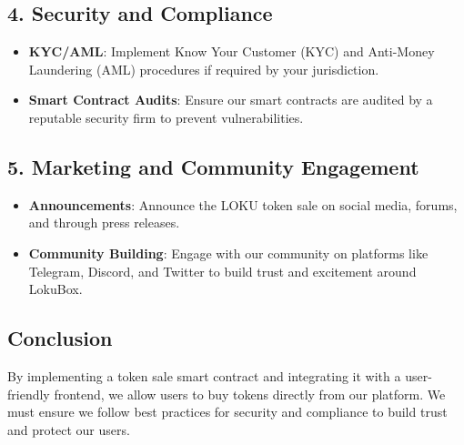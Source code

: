 \documentclass{tufte-handout}
\begin{document}
\subsection*{4. Security and Compliance}

\begin{itemize}
    \item \textbf{KYC/AML}: Implement Know Your Customer (KYC) and Anti-Money Laundering (AML) procedures if required by your jurisdiction.
    \item \textbf{Smart Contract Audits}: Ensure our smart contracts are audited by a reputable security firm to prevent vulnerabilities.
\end{itemize}

\subsection*{5. Marketing and Community Engagement}

\begin{itemize}
    \item \textbf{Announcements}: Announce the LOKU token sale on social media, forums, and through press releases.
    \item \textbf{Community Building}: Engage with our community on platforms like Telegram, Discord, and Twitter to build trust and excitement around LokuBox.
\end{itemize}

\subsection*{Conclusion}

By implementing a token sale smart contract and integrating it with a user-friendly frontend, we allow users to buy tokens directly from our platform.
We must ensure we follow best practices for security and compliance to build trust and protect our users.


\end{document}
